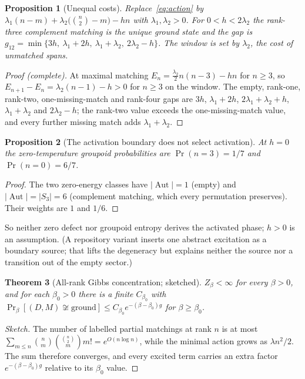 \documentclass[11pt]{article}
\newtheorem{theorem}{Theorem}[section]
\newtheorem{proposition}[theorem]{Proposition}
\theoremstyle{definition}
\theoremstyle{remark}
\newcommand{\Aut}{\operatorname{Aut}}
\begin{document}
\begin{proposition}[Unequal costs]
\label{prop:unequal}
Replace~\eqref{eq:action} by $\lambda_1(n-m)+\lambda_2\bigl(\binom n2-m\bigr)-hn$ with
$\lambda_1,\lambda_2>0$. For $0<h<2\lambda_2$ the rank-three complement matching is the
unique ground state and the gap is
$g_{12}=\min\{3h,\ \lambda_1+2h,\ \lambda_1+\lambda_2,\ 2\lambda_2-h\}$. The window is set
by $\lambda_2$, the cost of unmatched spans.
\end{proposition}

\begin{proof}[Proof (complete)]
At maximal matching $E_n=\frac{\lambda_2}{2}n(n-3)-hn$ for $n\ge3$, so $E_{n+1}-E_n=
\lambda_2(n-1)-h>0$ for $n\ge3$ on the window. The empty, rank-one, rank-two,
one-missing-match and rank-four gaps are $3h$, $\lambda_1+2h$, $2\lambda_1+\lambda_2+h$,
$\lambda_1+\lambda_2$ and $2\lambda_2-h$; the rank-two value exceeds the
one-missing-match value, and every further missing match adds $\lambda_1+\lambda_2$.
\end{proof}

\begin{proposition}[The activation boundary does not select activation]
\label{prop:boundary}
At $h=0$ the zero-temperature groupoid probabilities are $\Pr(n=3)=1/7$ and
$\Pr(n=0)=6/7$.
\end{proposition}

\begin{proof}
The two zero-energy classes have $|\Aut|=1$ (empty) and $|\Aut|=|S_3|=6$ (complement
matching, which every permutation preserves). Their weights are $1$ and $1/6$.
\end{proof}

So neither zero defect nor groupoid entropy derives the activated phase; $h>0$ is an
assumption. (A repository variant inserts one abstract excitation as a boundary source;
that lifts the degeneracy but explains neither the source nor a transition out of the
empty sector.)

\begin{theorem}[All-rank Gibbs concentration; sketched]
\label{thm:gibbs}
$Z_\beta<\infty$ for every $\beta>0$, and for each $\beta_0>0$ there is a finite
$C_{\beta_0}$ with $\Pr_\beta[(D,M)\not\cong\text{ground}]\le C_{\beta_0}e^{-(\beta-\beta_0)g}$
for $\beta\ge\beta_0$.
\end{theorem}

\begin{proof}[Sketch]
The number of labelled partial matchings at rank $n$ is at most
$\sum_{m\le n}\binom nm\binom{\binom n2}{m}m!=e^{O(n\log n)}$, while the minimal action grows
as $\lambda n^2/2$. The sum therefore converges, and every excited term carries an extra
factor $e^{-(\beta-\beta_0)g}$ relative to its $\beta_0$ value.
\end{proof}
\end{document}
